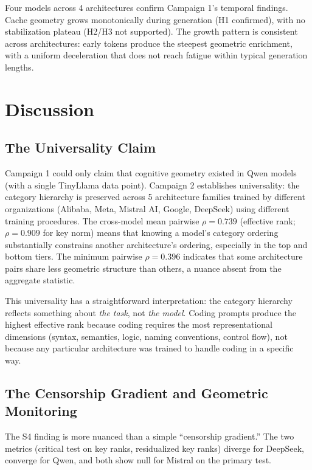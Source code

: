\documentclass[11pt,a4paper]{article}
\begin{document}
Four models across 4 architectures confirm Campaign 1's temporal findings. Cache geometry grows monotonically during generation (H1 confirmed), with no stabilization plateau (H2/H3 not supported). The growth pattern is consistent across architectures: early tokens produce the steepest geometric enrichment, with a uniform deceleration that does not reach fatigue within typical generation lengths.

\section{Discussion}
\label{sec:discussion}

\subsection{The Universality Claim}

Campaign 1 could only claim that cognitive geometry existed in Qwen models (with a single TinyLlama data point). Campaign 2 establishes universality: the category hierarchy is preserved across 5 architecture families trained by different organizations (Alibaba, Meta, Mistral AI, Google, DeepSeek) using different training procedures. The cross-model mean pairwise $\rho = 0.739$ (effective rank; $\rho = 0.909$ for key norm) means that knowing a model's category ordering substantially constrains another architecture's ordering, especially in the top and bottom tiers. The minimum pairwise $\rho = 0.396$ indicates that some architecture pairs share less geometric structure than others, a nuance absent from the aggregate statistic.

This universality has a straightforward interpretation: the category hierarchy reflects something about \emph{the task}, not \emph{the model}. Coding prompts produce the highest effective rank because coding requires the most representational dimensions (syntax, semantics, logic, naming conventions, control flow), not because any particular architecture was trained to handle coding in a specific way.

\subsection{The Censorship Gradient and Geometric Monitoring}

The S4 finding is more nuanced than a simple ``censorship gradient.'' The two metrics (critical test on key ranks, residualized key ranks) diverge for DeepSeek, converge for Qwen, and both show null for Mistral on the primary test.
\end{document}
